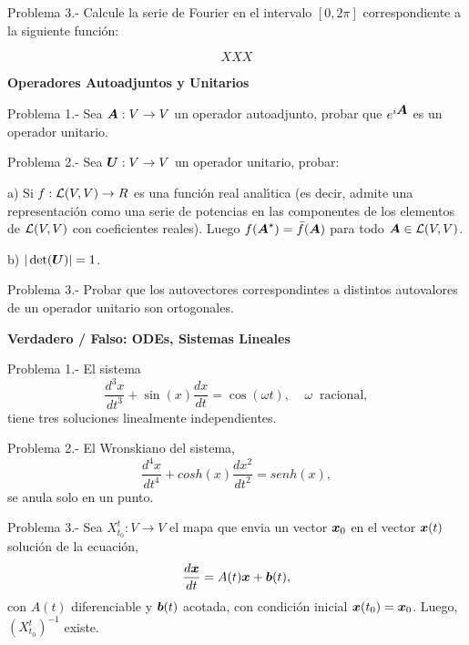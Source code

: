 \documentclass{article}
\newcommand{\ve}[1]{\mbox{\boldmath ${#1}$}}
\begin{document}
Problema 3.- Calcule la serie de Fourier en el intervalo $[0,2\pi]$ 
correspondiente a la siguiente funci\'on:

\begin{equation}
 XXX
\end{equation}


\newpage

\begin{center}
  \textbf{Operadores Autoadjuntos y Unitarios}
\end{center}

Problema 1.- Sea $\ve{A} : V \to V$ un operador autoadjunto, probar que
$e^{i\ve{A}}$ es un operador unitario.

Problema 2.- Sea $\ve{U} : V \to V$ un operador unitario, probar:

a) Si $f:{\cal{L}}(V,V) \to R$ es una funci\'on real anal\'\i{}tica
(es decir, admite una representaci\'on como una serie de potencias en las
componentes de los elementos de ${\cal{L}}(V,V)$ con coeficientes reales).
Luego $f(\ve{A}^{\star}) = \bar{f}(\ve{A})$ para todo 
$\ve{A} \in {\cal{L}}(V,V)$.

b) $|\det(\ve{U})| = 1$.

Problema 3.- Probar que los autovectores correspondintes a distintos autovalores de un operador unitario son ortogonales.


\vspace{1cm}


\begin{center}
  \textbf{Verdadero / Falso: ODEs, Sistemas Lineales}
\end{center}

Problema 1.- El sistema 
\begin{equation}
\frac{d^3x}{dt^3} + \sin(x)\frac{dx}{dt} = \cos(\omega t), \;\;\;\;
              \omega \;\; \mbox{racional},
\end{equation}
%
tiene tres soluciones linealmente independientes.

Problema 2.- El Wronskiano del sistema,
\begin{equation}
  \frac{d^4x}{dt^4} + cosh(x) \frac{dx^2}{dt^2} = senh(x),
\end{equation}
%
se anula solo en un punto.

Problema 3.- Sea $X^t_{t_0}: V \to V$ el mapa que envia un vector $\ve{x}_0$
en el vector $\ve{x}(t)$ soluci\'on de la ecuaci\'on,
\begin{equation}
  \frac{d\ve{x}}{dt} = A(t)\ve{x} + \ve{b}(t),
\end{equation}
con $A(t)$ diferenciable y $\ve{b}(t)$ acotada, con condici\'on inicial
$\ve{x}(t_0) = \ve{x}_0$.
Luego, $(X^t_{t_0})^{-1}$ existe.
\end{document}
